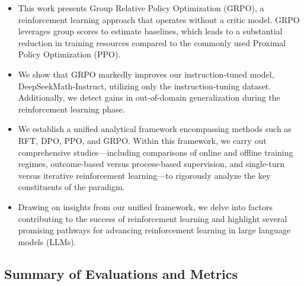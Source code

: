 \begin{itemize}[topsep=0pt]
    \item This work presents Group Relative Policy Optimization (GRPO), a reinforcement learning approach that operates without a critic model. GRPO leverages group scores to estimate baselines, which leads to a substantial reduction in training resources compared to the commonly used Proximal Policy Optimization (PPO).
    \item We show that GRPO markedly improves our instruction-tuned model, DeepSeekMath-Instruct, utilizing only the instruction-tuning dataset. Additionally, we detect gains in out-of-domain generalization during the reinforcement learning phase.
    \item We establish a unified analytical framework encompassing methods such as RFT, DPO, PPO, and GRPO. Within this framework, we carry out comprehensive studies—including comparisons of online and offline training regimes, outcome-based versus process-based supervision, and single-turn versus iterative reinforcement learning—to rigorously analyze the key constituents of the paradigm.
    \item Drawing on insights from our unified framework, we delve into factors contributing to the success of reinforcement learning and highlight several promising pathways for advancing reinforcement learning in large language models (LLMs).
\end{itemize}

\subsection{Summary of Evaluations and Metrics}

